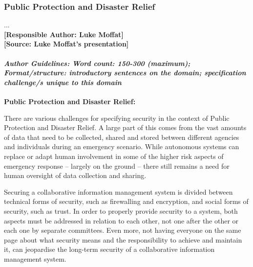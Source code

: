 \documentclass[sigconf]{acmart}
\begin{document}
\subsubsection{Public Protection and Disaster Relief}...\\
\noindent\textbf{[Responsible Author:  Luke Moffat]}\\
\noindent\textbf{[Source: Luke Moffat's presentation]}\\\\
\noindent\textbf{\textit{Author Guidelines: Word count: 150-300 (maximum); \\Format/structure: introductory sentences on the domain; specification challenge/s unique to this domain}}\\\\
\textbf{Public Protection and Disaster Relief:} 

There are various challenges for specifying security in the context of Public Protection and Disaster Relief. A large part of this comes from the vast amounts of data that need to be collected, shared and stored between different agencies and individuals during an emergency scenario. While autonomous systems can replace or adapt human involvement in some of the higher risk aspects of emergency response – largely on the ground – there still remains a need for human oversight of data collection and sharing.

Securing a collaborative information management system is divided between technical forms of security, such as firewalling and encryption, and social forms of security, such as trust. In order to properly provide security to a system, both aspects must be addressed in relation to each other, not one after the other or each one by separate committees. Even more, not having everyone on the same page about what security means and the responsibility to achieve and maintain it, can jeopardise the long-term security of a collaborative information management system.
\end{document}
